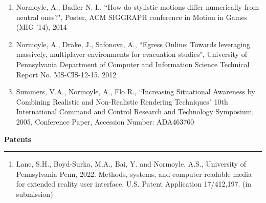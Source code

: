 \begin{enumerate}[leftmargin=*]
\item Normoyle, A., Badler N. I., ``How do stylistic motions differ numerically from neutral ones?", Poster, ACM SIGGRAPH conference in Motion in Games (MIG '14), 2014

\item Normoyle, A., Drake, J., Safonova, A., ``Egress Online: Towards leveraging massively, multiplayer environments for evacuation studies", University of Pennsylvania Department of Computer and Information Science Technical Report No. MS-CIS-12-15. 2012

\item Summers, V.A., Normoyle, A., Flo R., ``Increasing Situational Awareness by Combining Realistic and Non-Realistic Rendering Techniques" 10th International Command and Control Research and Technology Symposium, 2005, Conference Paper,  Accession Number: ADA463760 
\end{enumerate}

\medskip
\medskip

{\Large {\bf Patents}}
\vspace{0.1cm}
\hrule
\medskip

\begin{enumerate}[leftmargin=*]
  \item  Lane, S.H., Boyd-Surka, M.A., Bai, Y. and Normoyle, A.S., University of Pennsylvania Penn, 2022. Methods, systems, and computer readable media for extended reality user interface. U.S. Patent Application 17/412,197. (in submission)
\end{enumerate}

\medskip
\medskip


